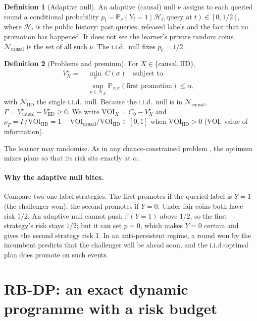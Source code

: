 \documentclass{article}
\theoremstyle{plain}
\theoremstyle{definition}
\newtheorem{definition}{Definition}
\theoremstyle{remark}
\newcommand{\PP}{\mathbb{P}}
\newcommand{\Vc}{V^\star_{\mathrm{causal}}}
\newcommand{\Vi}{V^\star_{\mathrm{IID}}}
\newcommand{\rhoG}{\rho_\Gamma}
\newcommand{\Ncaus}{\mathcal{N}_{\mathrm{causal}}}
\begin{document}
\begin{definition}[Adaptive null]
\label{def:null}
An adaptive (causal) null $\nu$ assigns to each queried round a conditional probability $p_t=\PP_\nu(Y_t=1\mid\mathcal{H}_t,\text{query at }t)\in[0,1/2]$, where $\mathcal{H}_t$ is the public history: past queries, released labels and the fact that no promotion has happened. It does not see the learner's private random coins. $\Ncaus$ is the set of all such $\nu$. The i.i.d.\ null fixes $p_t=1/2$.
\end{definition}

\begin{definition}[Problems and premium]
For $X\in\{\mathrm{causal},\mathrm{IID}\}$,
\begin{align*}
V^\star_X=\;&\min_{\sigma}\;C(\sigma)\quad\text{subject to}\\
&\sup_{\nu\in\mathcal{N}_X}\PP_{\nu,\sigma}(\text{first promotion})\le\alpha,
\end{align*}
with $\mathcal{N}_{\mathrm{IID}}$ the single i.i.d.\ null. Because the i.i.d.\ null is in $\Ncaus$, $\Gamma=\Vc-\Vi\ge 0$. We write $\mathrm{VOI}_X=C_0-V^\star_X$ and $\rhoG=\Gamma/\mathrm{VOI}_{\mathrm{IID}}=1-\mathrm{VOI}_{\mathrm{causal}}/\mathrm{VOI}_{\mathrm{IID}}\in[0,1]$ when $\mathrm{VOI}_{\mathrm{IID}}>0$ (VOI: value of information).
\end{definition}

The learner may randomise. As in any chance-constrained problem \citep{altman1999constrained,walraven2018column}, the optimum mixes plans so that its risk sits exactly at $\alpha$.

\paragraph{Why the adaptive null bites.} Compare two one-label strategies. The first promotes if the queried label is $Y=1$ (the challenger won); the second promotes if $Y=0$. Under fair coins both have risk $1/2$. An adaptive null cannot push $\PP(Y=1)$ above $1/2$, so the first strategy's risk stays $1/2$; but it can set $p=0$, which makes $Y=0$ certain and gives the second strategy risk 1. In an anti-persistent regime, a round won by the incumbent predicts that the challenger will be ahead soon, and the i.i.d.-optimal plan does promote on such events.

\section{RB-DP: an exact dynamic programme with a risk budget}
\label{sec:method}
\end{document}
